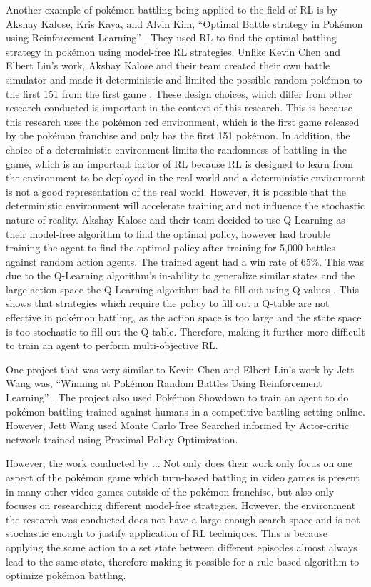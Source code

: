 Another example of pokémon battling being applied to the field of RL is by Akshay Kalose, Kris Kaya, and Alvin Kim, ``Optimal Battle strategy in Pokémon using Reinforcement Learning'' \cite{kalose2018optimal}. They used RL to find the optimal battling strategy in pokémon using model-free RL strategies. Unlike Kevin Chen and Elbert Lin's work, Akshay Kalose and their team created their own battle simulator and made it deterministic and limited the possible random pokémon to the first 151 from the first game \cite{kalose2018optimal}. These design choices, which differ from other research conducted is important in the context of this research. This is because this research uses the pokémon red environment, which is the first game released by the pokémon franchise and only has the first 151 pokémon. In addition, the choice of a deterministic environment limits the randomness of battling in the game, which is an important factor of RL because RL is designed to learn from the environment to be deployed in the real world and a deterministic environment is not a good representation of the real world. However, it is possible that the deterministic environment will accelerate training and not influence the stochastic nature of reality. Akshay Kalose and their team decided to use Q-Learning as their model-free algorithm to find the optimal policy, however had trouble training the agent to find the optimal policy after training for 5,000 battles against random action agents. The trained agent had a win rate of 65\%. This was due to the Q-Learning algorithm's in-ability to generalize similar states and the large action space the Q-Learning algorithm had to fill out using Q-values \cite{kalose2018optimal}. This shows that strategies which require the policy to fill out a Q-table are not effective in pokémon battling, as the action space is too large and the state space is too stochastic to fill out the Q-table. Therefore, making it further more difficult to train an agent to perform multi-objective RL.

One project that was very similar to Kevin Chen and Elbert Lin's work by Jett Wang was, ``Winning at Pokémon Random Battles Using Reinforcement Learning'' \cite{wang2024winning}. The project also used Pokémon Showdown to train an agent to do pokémon battling trained against humans in a competitive battling setting online. However, Jett Wang used Monte Carlo Tree Searched informed by Actor-critic network trained using Proximal Policy Optimization. 

However, the work conducted by ... Not only does their work only focus on one aspect of the pokémon game which turn-based battling in video games is present in many other video games outside of the pokémon franchise, but also only focuses on researching different model-free strategies. However, the environment the research was conducted does not have a large enough search space and is not stochastic enough to justify application of RL techniques. This is because applying the same action to a set state between different episodes almost always lead to the same state, therefore making it possible for a rule based algorithm to optimize pokémon battling. 



